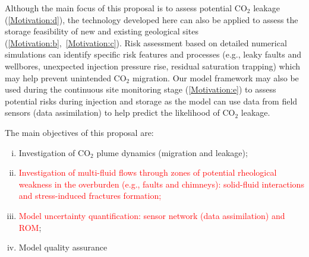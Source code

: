 \documentclass[12pts,a4paper,amsmath,amssymb,floatfix]{article}%
\newcommand{\red}{\textcolor{red}}
\newcommand{\CO}{CO\ensuremath{_{2}}}
\begin{document}
Although the main focus of this proposal is to assess potential \CO\; leakage (\ref{Motivation:d}), the technology developed here can also be applied to assess the storage feasibility of new and existing geological sites (\ref{Motivation:b},~\ref{Motivation:c}).  Risk assessment based on detailed numerical simulations can identify specific risk features and processes (e.g., leaky faults and wellbores, unexpected injection pressure rise, residual saturation trapping) which may help prevent unintended \CO\; migration. Our model framework may also be used during the continuous site monitoring stage (\ref{Motivation:e}) to assess potential risks during injection and storage as the model can use data from field sensors (data assimilation) to help predict the likelihood of \CO\; leakage.

The main objectives of this proposal are:
\begin{enumerate}[(i)]
%
   \item Investigation of \CO\; plume dynamics (migration and leakage);
%
   \item \red{Investigation of multi-fluid flows through zones of potential rheological weakness in the overburden (e.g., faults and chimneys): solid-fluid interactions and stress-induced fractures formation;}
%
   \item \red{Model uncertainty quantification: sensor network (data assimilation) and ROM};
%
   \item Model quality assurance
%
\end{enumerate}
\end{document}
